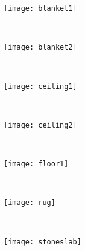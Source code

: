 \begin{figure}[!ht]
    
    \begin{subfigure}[b]{0.1\textwidth}
		\centering
		\texttt{[image: blanket1]}	
	\end{subfigure}
	~ %
    \begin{subfigure}[b]{0.1\textwidth}
		\centering
		\texttt{[image: blanket2]}	
	\end{subfigure}
    ~ %
    \begin{subfigure}[b]{0.1\textwidth}
		\centering
		\texttt{[image: ceiling1]}	
	\end{subfigure}
	~ %
    \begin{subfigure}[b]{0.1\textwidth}
		\centering
		\texttt{[image: ceiling2]}	
	\end{subfigure}
    ~ %
    \begin{subfigure}[b]{0.1\textwidth}
		\centering
		\texttt{[image: floor1]}	
	\end{subfigure}
    ~ %
    \begin{subfigure}[b]{0.1\textwidth}
		\centering
		\texttt{[image: rug]}	
	\end{subfigure}
    ~ %
    \begin{subfigure}[b]{0.1\textwidth}
		\centering
		\texttt{[image: stoneslab]}	
	\end{subfigure} \\[2ex]
    

\end{figure}
